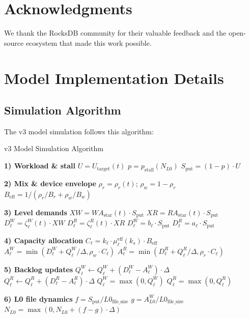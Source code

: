 \documentclass[11pt]{article}
\begin{document}
\section*{Acknowledgments}

We thank the RocksDB community for their valuable feedback and the open-source ecosystem that made this work possible.


\appendix

\section{Model Implementation Details}




\subsection{Simulation Algorithm}

The v3 model simulation follows this algorithm:

\begin{algorithm}[H]
\caption{v3 Model Simulation Algorithm}
\begin{algorithmic}[1]
\FOR{$t \in [0, T)$ step $\Delta$}
    \STATE \textbf{1) Workload \& stall}
    \STATE $U = U_{\text{target}}(t)$
    \STATE $p = p_{\text{stall}}(N_{L0})$
    \STATE $S_{\text{put}} = (1 - p) \cdot U$
    
    \STATE \textbf{2) Mix \& device envelope}
    \STATE $\rho_r = \rho_r(t)$; $\rho_w = 1 - \rho_r$
    \STATE $B_{\text{eff}} = 1 / (\rho_r/B_r + \rho_w/B_w)$
    
    \STATE \textbf{3) Level demands}
        \STATE $XW = WA_{\text{star}}(t) \cdot S_{\text{put}}$
        \STATE $XR = RA_{\text{star}}(t) \cdot S_{\text{put}}$
        \STATE $D^W_\ell = \zeta^W_\ell(t) \cdot XW$
        \STATE $D^R_\ell = \zeta^R_\ell(t) \cdot XR$
    \ELSE
        \STATE $D^W_\ell = b_\ell \cdot S_{\text{put}}$
        \STATE $D^R_\ell = a_\ell \cdot S_{\text{put}}$
    \ENDIF
    
    \STATE \textbf{4) Capacity allocation}
    \STATE $C_\ell = k_\ell \cdot \mu_\ell^{\text{eff}}(k_s) \cdot B_{\text{eff}}$
    \STATE $A^W_\ell = \min(D^W_\ell + Q^W_\ell/\Delta, \rho_w \cdot C_\ell)$
    \STATE $A^R_\ell = \min(D^R_\ell + Q^R_\ell/\Delta, \rho_r \cdot C_\ell)$
    
    \STATE \textbf{5) Backlog updates}
    \STATE $Q^W_\ell \leftarrow Q^W_\ell + (D^W_\ell - A^W_\ell) \cdot \Delta$
    \STATE $Q^R_\ell \leftarrow Q^R_\ell + (D^R_\ell - A^R_\ell) \cdot \Delta$
    \STATE $Q^W_\ell = \max(0, Q^W_\ell)$
    \STATE $Q^R_\ell = \max(0, Q^R_\ell)$
    
    \STATE \textbf{6) L0 file dynamics}
    \STATE $f = S_{\text{put}} / L0_{\text{file\_size}}$
    \STATE $g = A^W_{L0} / L0_{\text{file\_size}}$
    \STATE $N_{L0} = \max(0, N_{L0} + (f - g) \cdot \Delta)$
\ENDFOR
\end{algorithmic}
\end{algorithm}
\end{document}
